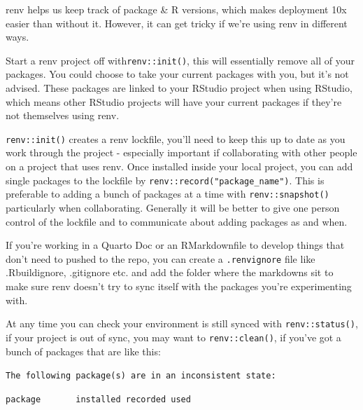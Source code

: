 \documentclass[
  letterpaper,
  DIV=11,
  numbers=noendperiod]{scrreprt}
\begin{document}
\begin{tcolorbox}[enhanced jigsaw, opacitybacktitle=0.6, breakable, title=\textcolor{quarto-callout-tip-color}{\faLightbulb}\hspace{0.5em}{On using renv collaboratively}, arc=.35mm, colframe=quarto-callout-tip-color-frame, colbacktitle=quarto-callout-tip-color!10!white, left=2mm, bottomrule=.15mm, opacityback=0, toprule=.15mm, bottomtitle=1mm, toptitle=1mm, titlerule=0mm, leftrule=.75mm, colback=white, rightrule=.15mm, coltitle=black]

renv helps us keep track of package \& R versions, which makes
deployment 10x easier than without it. However, it can get tricky if
we're using renv in different ways.

Start a renv project off with\texttt{renv::init()}, this will
essentially remove all of your packages. You could choose to take your
current packages with you, but it's not advised. These packages are
linked to your RStudio project when using RStudio, which means other
RStudio projects will have your current packages if they're not
themselves using renv.

\texttt{renv::init()} creates a renv lockfile, you'll need to keep this
up to date as you work through the project - especially important if
collaborating with other people on a project that uses renv. Once
installed inside your local project, you can add single packages to the
lockfile by \texttt{renv::record("package\_name")}. This is preferable
to adding a bunch of packages at a time with \texttt{renv::snapshot()}
particularly when collaborating. Generally it will be better to give one
person control of the lockfile and to communicate about adding packages
as and when.

If you're working in a Quarto Doc or an RMarkdownfile to develop things
that don't need to pushed to the repo, you can create a
\texttt{.renvignore} file like .Rbuildignore, .gitignore etc. and add
the folder where the markdowns sit to make sure renv doesn't try to sync
itself with the packages you're experimenting with.

At any time you can check your environment is still synced with
\texttt{renv::status()}, if your project is out of sync, you may want to
\texttt{renv::clean()}, if you've got a bunch of packages that are like
this:

\texttt{The\ following\ package(s)\ are\ in\ an\ inconsistent\ state:}

\texttt{package\ \ \ \ \ \ \ installed\ recorded\ used}


\end{tcolorbox}
\end{document}
